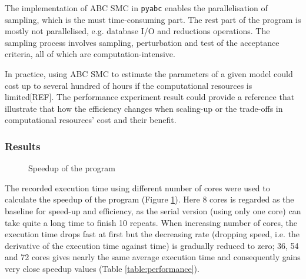 The implementation of ABC SMC in \verb|pyabc| enables the parallelisation of sampling, which is the must time-consuming part. The rest part of the program is mostly not parallelised, e.g. database I/O and reductions operations. The sampling process involves sampling, perturbation and test of the acceptance criteria, all of which are computation-intensive.

In practice, using ABC SMC to estimate the parameters of a given model could cost up to several hundred of hours if the computational resources is limited[REF]. The performance experiment result could provide a reference that illustrate that how the efficiency changes when scaling-up or the trade-offs in computational resources' cost and their benefit.

\subsubsection{Results}




\begin{figure}[h]
    \begin{center}
    \end{center}

    \caption[Speedup of the program]{Speedup of the program}
    \label{fig:speedup}
\end{figure}

The recorded execution time using different number of cores were used to calculate the speedup of the program (Figure \ref{fig:speedup}). Here 8 cores is regarded as the baseline for speed-up and efficiency, as the serial version (using only one core) can take quite a long time to finish 10 repeats. When increasing number of cores, the execution time drops fast at first but the decreasing rate (dropping speed, i.e. the derivative of the execution time against time) is gradually reduced to zero; 36, 54 and 72 cores gives nearly the same average execution time and consequently gains very close speedup values (Table \ref{table:performance}).

